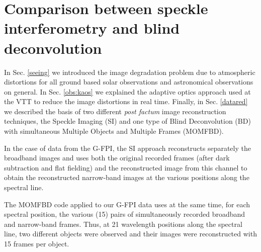 \begin{comment}
The information contained in the H$\alpha$ profile in two spatial co-ordinates and along the time turned out to be highly valuable. One can retrieve physical atmospheric parameters in all spatial positions and follow the chromospheric structures during their evolution. Beyond the examples presented above, many more dynamic phenomena in the active solar chromosphere can be studied with the present data set.

Yet: ``The opportunity makes the thief''. We have learned that the sequential
scanning with cadence of 22~s is not fast enough in some cases. Temporal
resolutions of few secons, 2--3~seconds say, are sometimes needed. For future
observations, we can design scanning modes of this resolution with images at fewer wavelength positions. Furthermore, future developments of telescopic instrumentation, of adaptive optics, detectors, and  data analysis including image restoration will give the required spatial and temporal information about the processes in the solar chromosphere.
\end{comment}

\clearpage


\section{Comparison between speckle interferometry and blind deconvolution \label{sec:comp}}

In Sec. \ref{seeing} we introduced the image degradation problem due to atmospheric distortions for all ground based solar observations and astronomical observations on general. In Sec. \ref{obs:kaos} we explained the adaptive optics approach used at the VTT to reduce the image distortions in real time. Finally, in Sec.  \ref{datared} we described the basis of two different \emph{post factum} image reconstruction techniques,  the Speckle Imaging (SI) and one type of Blind Deconvolution (BD) with  simultaneous Multiple Objects and Multiple Frames (MOMFBD).
 
In the case of data from the G-FPI, the SI approach reconstructs separately the broadband images and uses both the original recorded frames (after dark subtraction and flat fielding) and the reconstructed image from this channel to obtain the reconstructed narrow-band images at the various positions along the spectral line.

The MOMFBD code applied to our G-FPI data uses at the same time, for each spectral position, the various (15) pairs of simultaneously recorded broadband and narrow-band frames. Thus, at 21 wavelength positions along the spectral line, two different objects were observed and their images were reconstructed with 15 frames per object.


